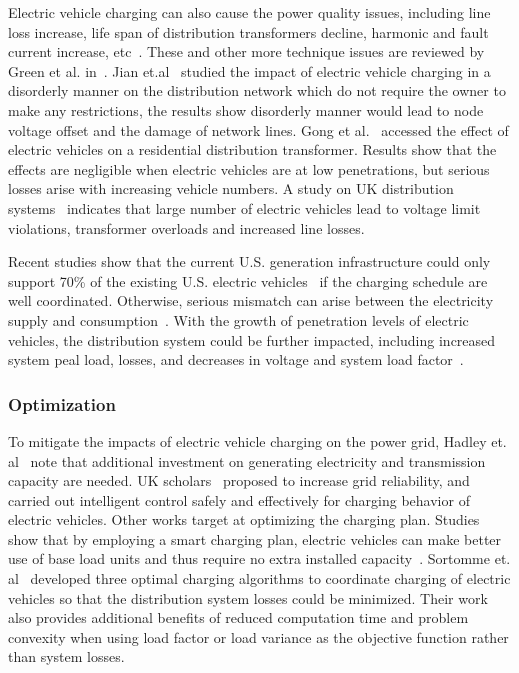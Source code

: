 Electric vehicle charging can also cause the power quality issues, including line loss increase, life span of distribution transformers decline, harmonic and fault current increase, etc~\cite{YC_Papadopoulos27,YC_Richardson28,YC_Gomez29,YC_Chan30,YC_Leite33}. 
These and other more technique issues are reviewed by Green et al. in~\cite{YC_Green}. 
Jian et.al~\cite{YC_Jian} studied the impact of electric vehicle charging in a disorderly manner on the distribution network which do not require the owner to make any restrictions, the results show disorderly manner would lead to node voltage offset and the damage of network lines. 
Gong et al.~\cite{YC_Gong} accessed the effect of electric vehicles on a residential distribution transformer. 
Results show that the effects are negligible when electric vehicles are at low penetrations, but serious losses arise with increasing vehicle numbers.
A study on UK distribution systems~\cite{YC_Papadopoulos} indicates that large number of electric vehicles lead to voltage limit violations, transformer overloads and increased line losses. 

Recent studies show that the current U.S. generation infrastructure  could only support 70\% of the existing U.S. electric vehicles~\cite{YC_Schneider} if the charging schedule are well coordinated. 
Otherwise, serious mismatch can arise between the electricity supply and consumption~\cite{YC_Hadley18}.
With the growth of penetration levels of electric vehicles, the distribution system could be further impacted, including increased system peal load, losses, and decreases in voltage and system load factor~\cite{YC_Roe,YC_Clement09}.


\subsubsection{Optimization}

To mitigate the impacts of electric vehicle charging on the power grid, Hadley et. al~\cite{YC_Hadley} note that additional investment on generating electricity and transmission capacity are needed. 
UK scholars~\cite{YC_Papadopoulos} proposed to increase grid reliability, and carried out intelligent control safely and effectively for charging behavior of electric vehicles.
Other works target at optimizing the charging plan. Studies show that by employing a smart charging plan, electric vehicles can make better use of base load units and thus require no extra installed capacity~\cite{YC_JUUL20113523,YC_Denholm21}. 
Sortomme et. al~\cite{YC_Sortomme} developed three optimal charging algorithms to coordinate charging of electric vehicles so that the distribution system losses could be minimized. 
Their work also provides additional benefits of reduced computation time and problem convexity when using load factor or load variance as the objective function rather than system losses. 

